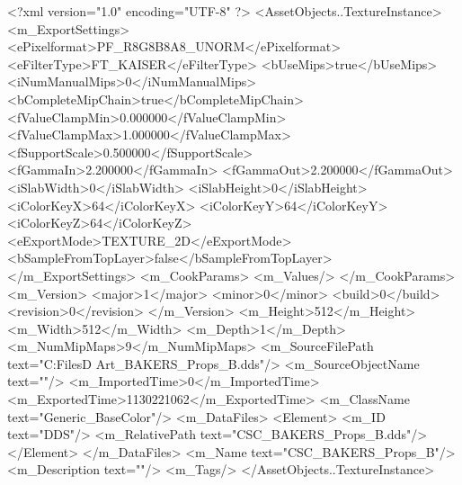 <?xml version="1.0" encoding="UTF-8" ?>
<AssetObjects..TextureInstance>
	<m_ExportSettings>
		<ePixelformat>PF_R8G8B8A8_UNORM</ePixelformat>
		<eFilterType>FT_KAISER</eFilterType>
		<bUseMips>true</bUseMips>
		<iNumManualMips>0</iNumManualMips>
		<bCompleteMipChain>true</bCompleteMipChain>
		<fValueClampMin>0.000000</fValueClampMin>
		<fValueClampMax>1.000000</fValueClampMax>
		<fSupportScale>0.500000</fSupportScale>
		<fGammaIn>2.200000</fGammaIn>
		<fGammaOut>2.200000</fGammaOut>
		<iSlabWidth>0</iSlabWidth>
		<iSlabHeight>0</iSlabHeight>
		<iColorKeyX>64</iColorKeyX>
		<iColorKeyY>64</iColorKeyY>
		<iColorKeyZ>64</iColorKeyZ>
		<eExportMode>TEXTURE_2D</eExportMode>
		<bSampleFromTopLayer>false</bSampleFromTopLayer>
	</m_ExportSettings>
	<m_CookParams>
		<m_Values/>
	</m_CookParams>
	<m_Version>
		<major>1</major>
		<minor>0</minor>
		<build>0</build>
		<revision>0</revision>
	</m_Version>
	<m_Height>512</m_Height>
	<m_Width>512</m_Width>
	<m_Depth>1</m_Depth>
	<m_NumMipMaps>9</m_NumMipMaps>
	<m_SourceFilePath text="C:\Users\Shadow\Desktop\Working Files\3D Art\Props\Bakers\CSC_BAKERS_Props_B.dds"/>
	<m_SourceObjectName text=""/>
	<m_ImportedTime>0</m_ImportedTime>
	<m_ExportedTime>1130221062</m_ExportedTime>
	<m_ClassName text="Generic_BaseColor"/>
	<m_DataFiles>
		<Element>
			<m_ID text="DDS"/>
			<m_RelativePath text="CSC_BAKERS_Props_B.dds"/>
		</Element>
	</m_DataFiles>
	<m_Name text="CSC_BAKERS_Props_B"/>
	<m_Description text=""/>
	<m_Tags/>
</AssetObjects..TextureInstance>

